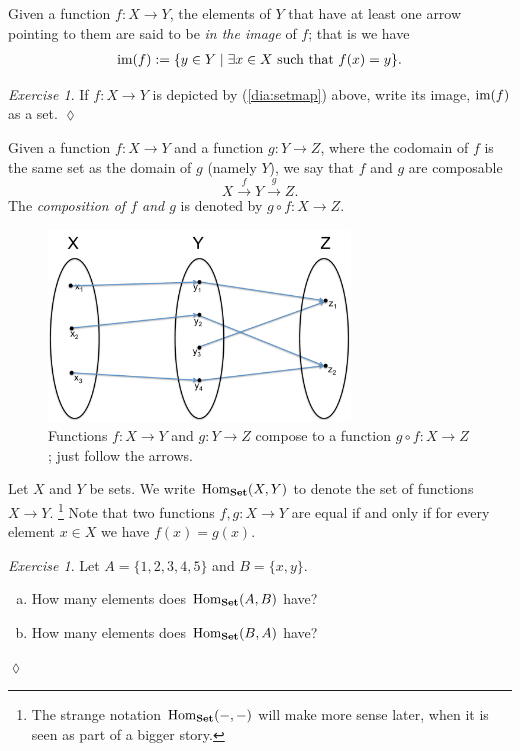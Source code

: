 \documentclass{book}
\def\tn{\textnormal}
\def\Hom{\tn{Hom}}
\def\im{\tn{im}}
\def\to{\rightarrow}
\def\taking{\colon}
\def\|{{\;|\;}}
\newcommand{\Too}[1]{\xrightarrow{\ \ #1\ \ }}
\def\Set{{\bf Set}}
\theoremstyle{remark}
\newtheorem{exc}[subsubsection]{Exercise}
\newenvironment{exercise}{\begin{exc}}{\hspace*{\fill}$\lozenge$\end{exc}}
\theoremstyle{definition}
\def\sexc{\begin{enumerate}[a.)]\setlength{\itemsep}{.1cm}\setlength{\parskip}{.1cm}\item}
\def\next{\item}
\def\endsexc{\end{enumerate}}
\begin{document}
Given a function $f\taking X\to Y$, the elements of $Y$ that have at least one arrow pointing to them are said to be {\em in the image} of $f$; that is we have 
\begin{align}\label{dia:image}
\im(f):=\{y\in Y\| \exists x\in X \tn{ such that } f(x)=y\}.
\end{align} 

\begin{exercise}
If $f\taking X\to Y$ is depicted by (\ref{dia:setmap}) above, write its image, $\im(f)$ as a set.
\end{exercise}

Given a function $f\taking X\to Y$ and a function $g\taking Y\to Z$, where the codomain of $f$ is the same set as the domain of $g$ (namely $Y$), we say that $f$ and $g$ are composable 
$$X\Too{f}Y\Too{g}Z.$$ The {\em composition of $f$ and $g$}\label{function composition} is denoted by $g\circ f\taking X\to Z$. 

\begin{figure}[h]
\begin{center}
\includegraphics[height=2in]{composition}
\end{center}
\caption{Functions $f\taking X\to Y$ and $g\taking Y\to Z$ compose to a function $g\circ f\taking X\to Z$; just follow the arrows.}
\end{figure}

Let $X$ and $Y$ be sets. We write $\Hom_\Set(X,Y)$\index{a symbol!$\Hom_\Set$} to denote the set of functions $X\to Y$.
\footnote{The strange notation $\Hom_\Set(-,-)$ will make more sense later, when it is seen as part of a bigger story.} 
Note that two functions $f,g\taking X\to Y$ are equal if and only if for every element $x\in X$ we have $f(x)=g(x)$. 

\begin{exercise}
Let $A=\{1,2,3,4,5\}$ and $B=\{x,y\}.$ 
\sexc How many elements does $\Hom_\Set(A,B)$ have? 
\next How many elements does $\Hom_\Set(B,A)$ have?
\endsexc
\end{exercise}
\end{document}
